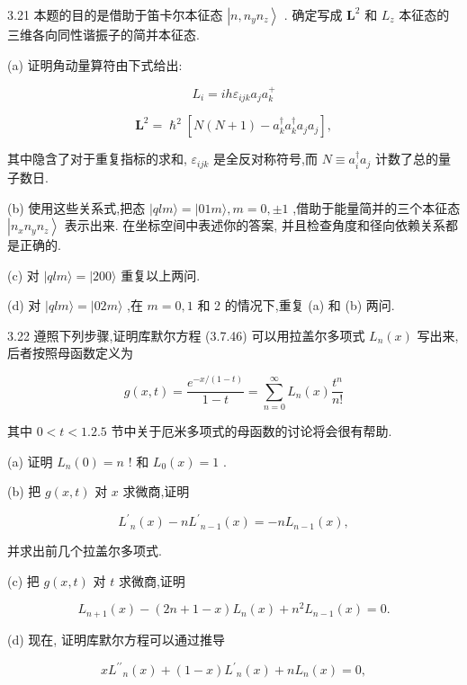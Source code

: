 3.21 本题的目的是借助于笛卡尔本征态 $\left| {n,{n}_{y}{n}_{z}}\right\rangle$ . 确定写成 ${\mathbf{L}}^{2}$ 和 ${L}_{z}$ 本征态的三维各向同性谐振子的简并本征态.

(a) 证明角动量算符由下式给出:

$$
{L}_{i} = {ih}{\varepsilon }_{ijk}{a}_{j}{a}_{k}^{ + }
$$

$$
{\mathbf{L}}^{2} = {\hslash }^{2}\left\lbrack {N\left( {N + 1}\right) - {a}_{k}^{ \dagger }{a}_{k}^{ \dagger }{a}_{j}{a}_{j}}\right\rbrack ,
$$

其中隐含了对于重复指标的求和, ${\varepsilon }_{ijk}$ 是全反对称符号,而 $N \equiv {a}_{i}^{ \dagger }{a}_{j}$ 计数了总的量子数日.

(b) 使用这些关系式,把态 $\left| {{qlm}\rangle = }\right| {01m}\rangle, m = 0, \pm 1$ ,借助于能量简并的三个本征态 $\left| {{n}_{x}{n}_{y}{n}_{z}}\right\rangle$ 表示出来. 在坐标空间中表述你的答案, 并且检查角度和径向依赖关系都是正确的.

(c) 对 $\left| {{qlm}\rangle = }\right| {200}\rangle$ 重复以上两问.

(d) 对 $\left| {{qlm}\rangle = }\right| {02m}\rangle$ ,在 $m = 0,1$ 和 2 的情况下,重复 (a) 和 (b) 两问.

3.22 遵照下列步骤,证明库默尔方程 (3.7.46) 可以用拉盖尔多项式 ${L}_{n}\left( x\right)$ 写出来,后者按照母函数定义为

$$
g\left( {x, t}\right) = \frac{{e}^{-x/\left( {1 - t}\right) }}{1 - t} = \mathop{\sum }\limits_{{n = 0}}^{\infty }{L}_{n}\left( x\right) \frac{{t}^{n}}{n!}
$$

其中 $0 < t < 1.{2.5}$ 节中关于厄米多项式的母函数的讨论将会很有帮助.

(a) 证明 ${L}_{n}\left( 0\right) = n$ ! 和 ${L}_{0}\left( x\right) = 1$ .

(b) 把 $g\left( {x, t}\right)$ 对 $x$ 求微商,证明

$$
{L}^{\prime }{}_{n}\left( x\right) - n{L}^{\prime }{}_{n - 1}\left( x\right) = - n{L}_{n - 1}\left( x\right) ,
$$

并求出前几个拉盖尔多项式.

(c) 把 $g\left( {x, t}\right)$ 对 $t$ 求微商,证明

$$
{L}_{n + 1}\left( x\right) - \left( {{2n} + 1 - x}\right) {L}_{n}\left( x\right) + {n}^{2}{L}_{n - 1}\left( x\right) = 0.
$$

(d) 现在, 证明库默尔方程可以通过推导

$$
x{L}^{\prime \prime }{}_{n}\left( x\right) + \left( {1 - x}\right) {L}^{\prime }{}_{n}\left( x\right) + n{L}_{n}\left( x\right) = 0,
$$

